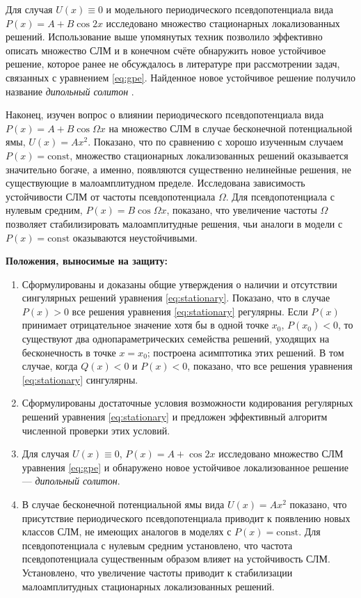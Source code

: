 \documentclass[candidate, href, colorlinks]{disser}
\begin{document}
Для случая $U(x) \equiv 0$ и модельного периодического псевдопотенциала вида $P(x) = A + B \cos 2x$ исследовано множество стационарных локализованных решений.
Использование выше упомянутых техник позволило эффективно описать множество СЛМ и в конечном счёте обнаружить новое устойчивое решение, которое ранее не обсуждалось в литературе при рассмотрении задач, связанных с уравнением \eqref{eq:gpe}.
Найденное новое устойчивое решение получило название {\it дипольный солитон} \cite{LebedevAlfimovMalomed}.

Наконец, изучен вопрос о влиянии периодического псевдопотенциала вида $P(x) = A + B \cos \Omega x$ на множество СЛМ в случае бесконечной потенциальной ямы, $U(x) = A x^2$.
Показано, что по сравнению с хорошо изученным случаем $P(x) = \mathrm{const}$, множество стационарных локализованных решений оказывается значительно богаче, а именно, появляются существенно нелинейные решения, не существующие в малоамплитудном пределе.
Исследована зависимость устойчивости СЛМ от частоты псевдопотенциала $\Omega$.
Для псевдопотенциала с нулевым средним, $P(x) = B \cos \Omega x$, показано, что увеличение частоты $\Omega$ позволяет стабилизировать малоамплитудные решения, чьи аналоги в модели с $P(x) = \mathrm{const}$ оказываются неустойчивыми.


\textbf{Положения, выносимые на защиту:}
\begin{enumerate}
	\item Сформулированы и доказаны общие утверждения о наличии и отсутствии сингулярных решений уравнения \eqref{eq:stationary}.
		Показано, что в случае $P(x) > 0$ все решения уравнения \eqref{eq:stationary} регулярны.
		Если $P(x)$ принимает отрицательное значение хотя бы в одной точке $x_0$, $P(x_0) < 0$, то существуют два однопараметрических семейства решений, уходящих на бесконечность в точке $x = x_0$; построена асимптотика этих решений. 
		В том случае, когда $Q(x) < 0$ и $P(x) < 0$, показано, что все решения уравнения \eqref{eq:stationary} сингулярны.
	\item Сформулированы достаточные условия возможности кодирования регулярных решений уравнения \eqref{eq:stationary} и предложен эффективный алгоритм численной проверки этих условий.
	\item Для случая $U(x) \equiv 0$, $P(x) = A + \cos 2x$ исследовано множество СЛМ уравнения \eqref{eq:gpe} и обнаружено новое устойчивое локализованное решение --- {\it дипольный солитон}.
	\item В случае бесконечной потенциальной ямы вида $U(x) = A x^2$ показано, что присутствие периодического псевдопотенциала приводит к появлению новых классов СЛМ, не имеющих аналогов в моделях с $P(x) = \mathrm{const}$.
		Для псевдопотенциала с нулевым средним установлено, что частота псевдопотенциала существенным образом влияет на устойчивость СЛМ.
		Установлено, что увеличение частоты приводит к стабилизации малоамплитудных стационарных локализованных решений.
\end{enumerate}
\end{document}
